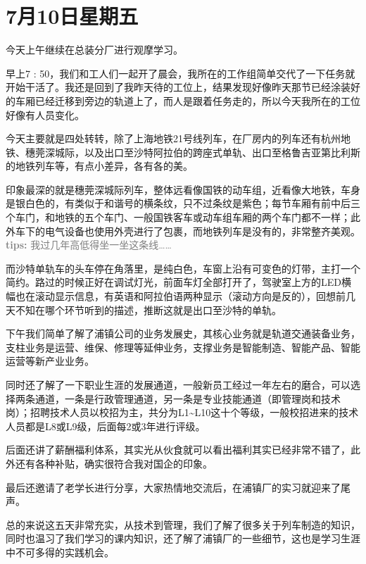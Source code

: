 \documentclass[12pt, oneside, a4paper]{ctexart}
\newcommand{\diaryJournalBodyFont}{\diarySong\fontsize{12pt}{15pt}\selectfont}
\begin{document}
\section*{7月10日\quad{}星期五}
\diaryJournalBodyFont\vspace{-3mm}\par{}
今天上午继续在总装分厂进行观摩学习。\par{}
早上7 : 50，我们和工人们一起开了晨会，我所在的工作组简单交代了一下任务就开始干活了。我还是回到了我昨天待的工位上，结果发现好像昨天那节已经涂装好的车厢已经迁移到旁边的轨道上了，而人是跟着任务走的，所以今天我所在的工位好像有人员变化。\par{}
今天主要就是四处转转，除了上海地铁21号线列车，在厂房内的列车还有杭州地铁、穗莞深城际，以及出口至沙特阿拉伯的跨座式单轨、出口至格鲁吉亚第比利斯的地铁列车等，有点小差异，各有各的美。\par{}
印象最深的就是穗莞深城际列车，整体远看像国铁的动车组，近看像大地铁，车身是银白色的，有类似于和谐号的横条纹，只不过条纹是紫色；每节车厢有前中后三个车门，和地铁的五个车门、一般国铁客车或动车组车厢的两个车门都不一样；此外车下的电气设备也使用外壳进行了包裹，而地铁列车是没有的，非常整齐美观。\textcolor{gray}{{\bf{}tips: }我过几年高低得坐一坐这条线……}\par{}
而沙特单轨车的头车停在角落里，是纯白色，车窗上沿有可变色的灯带，主打一个简约。路过的时候正好在调试灯光，前面车灯全部打开了，驾驶室上方的LED横幅也在滚动显示信息，有英语和阿拉伯语两种显示（滚动方向是反的），回想前几天不知在哪个环节听到的描述，推断这就是出口至沙特的单轨。\par{}
下午我们简单了解了浦镇公司的业务发展史，其核心业务就是轨道交通装备业务，支柱业务是运营、维保、修理等延伸业务，支撑业务是智能制造、智能产品、智能运营等新产业业务。\par{}
同时还了解了一下职业生涯的发展通道，一般新员工经过一年左右的磨合，可以选择两条通道，一条是行政管理通道，另一条是专业技能通道（即管理岗和技术岗）；招聘技术人员以校招为主，共分为L1\textasciitilde{}L10这十个等级，一般校招进来的技术人员都是L8或L9级，后面每2或3年进行评级。\par{}
后面还讲了薪酬福利体系，其实光从伙食就可以看出福利其实已经非常不错了，此外还有各种补贴，确实很符合我对国企的印象。\par{}
最后还邀请了老学长进行分享，大家热情地交流后，在浦镇厂的实习就迎来了尾声。\par{}
总的来说这五天非常充实，从技术到管理，我们了解了很多关于列车制造的知识，同时也温习了我们学习的课内知识，还了解了浦镇厂的一些细节，这也是学习生涯中不可多得的实践机会。\par{}
\end{document}
